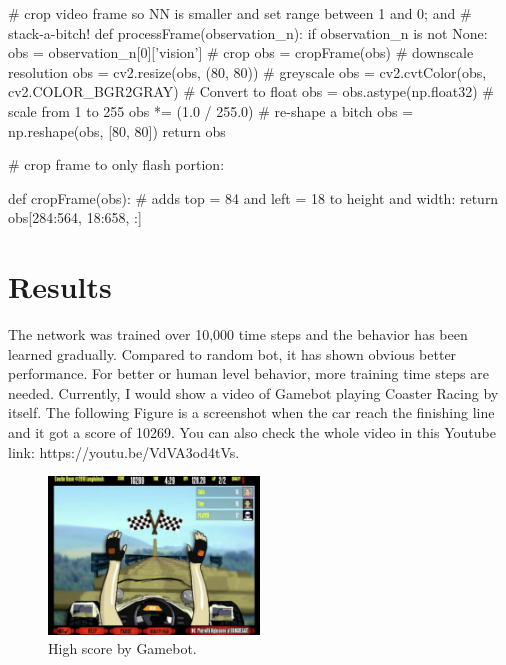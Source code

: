 \documentclass[a4paper]{article}
\begin{document}
\begin{python}
# crop video frame so NN is smaller and set range between 1 and 0; and
# stack-a-bitch!
def processFrame(observation_n):
    if observation_n is not None:
        obs = observation_n[0]['vision']
        # crop
        obs = cropFrame(obs)
        # downscale resolution
        obs = cv2.resize(obs, (80, 80))
        # greyscale
        obs = cv2.cvtColor(obs, cv2.COLOR_BGR2GRAY)
        # Convert to float
        obs = obs.astype(np.float32)
        # scale from 1 to 255
        obs *= (1.0 / 255.0)
        # re-shape a bitch
        obs = np.reshape(obs, [80, 80])
    return obs

# crop frame to only flash portion:


def cropFrame(obs):
    # adds top = 84 and left = 18 to height and width:
    return obs[284:564, 18:658, :]
\end{python}

\section{Results}

The network was trained over 10,000 time steps and the behavior has been learned gradually. Compared to random bot, it has shown obvious better performance. For better or human level behavior, more training time steps are needed. Currently, I would show a video of Gamebot playing Coaster Racing by itself. The following Figure is a screenshot when the car reach the finishing line and it got a score of 10269. You can also check the whole video in this Youtube link: https://youtu.be/VdVA3od4tVs.

\begin{figure}[h]
\centering
\includegraphics[width=0.5\textwidth]{high-score-by-gamebot}
\caption{High score by Gamebot.}
\end{figure}
\end{document}
